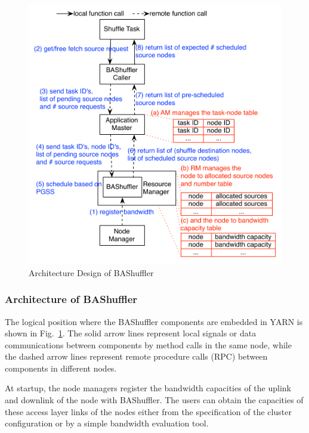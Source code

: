 \documentclass[10pt,journal,compsoc]{IEEEtran}
\begin{document}
\begin{figure}
\centering

\includegraphics[width=1\columnwidth]{figure1}

\caption{Architecture Design of BAShuffler}
\label{fig:bashuffler}
\end{figure}

\subsubsection{Architecture of BAShuffler}
The logical position where the BAShuffler components are embedded in YARN is shown in Fig.~\ref{fig:bashuffler}. 
The solid arrow lines represent local signals or data communications
between components by method calls in the same node,
while the dashed arrow lines represent remote procedure calls (RPC)
between components in different nodes.

At startup, the node managers register the bandwidth capacities of the uplink
and downlink of the node with BAShuffler. The users can obtain the
capacities of these access layer links of the nodes either from the
specification of the cluster configuration or by a simple bandwidth
evaluation tool.
\end{document}
